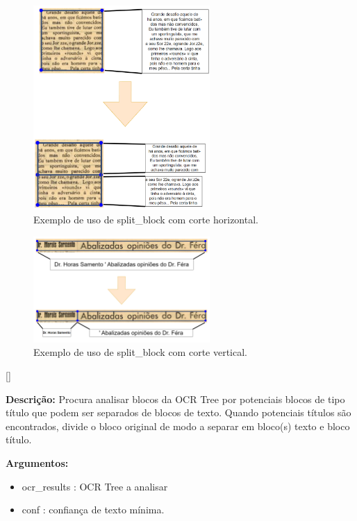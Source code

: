 \begin{figure}[H]
	\centering
	\includegraphics[width=0.6\textwidth]{images/ilustracoes/split_block_horizontal.png}
	\caption{Exemplo de uso de split\_block com corte horizontal.}
	\label{fig:split_block_horizontal}
\end{figure}

\begin{figure}[H]
	\centering
	\includegraphics[width=0.6\textwidth]{images/ilustracoes/split_block_vertical.png}
	\caption{Exemplo de uso de split\_block com corte vertical.}
	\label{fig:split_block_vertical}
\end{figure}



[\normalsize]

\textbf{Descrição:} Procura analisar blocos da OCR Tree por potenciais blocos de tipo título que podem ser separados de blocos de texto. Quando potenciais títulos são encontrados, divide o bloco original de modo a separar em bloco(s) texto e bloco título.

\textbf{Argumentos:}
\begin{itemize}\setlength\itemsep{-0.3em}
	\vspace{-0.5em}
	\item ocr\_results : OCR Tree a analisar
	\item conf : confiança de texto mínima.
\end{itemize}

